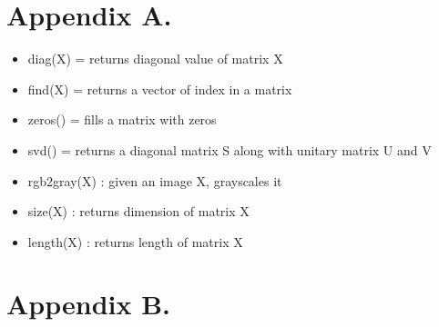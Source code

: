 \documentclass[a4paper,12pt]{article}
\begin{document}
\section{Appendix A. }
\begin{itemize}
  \item diag(X) = returns diagonal value of matrix X
  \item find(X) = returns a vector of index in a matrix
	\item  zeros() = fills a matrix with zeros
	\item svd() = returns a diagonal matrix S along with unitary matrix U and V
	\item rgb2gray(X) : given an image X, grayscales it
	\item size(X) : returns dimension of matrix X
	\item length(X) : returns length of matrix X
  
\end{itemize}
\newpage
\section{Appendix B.}

\end{document}
